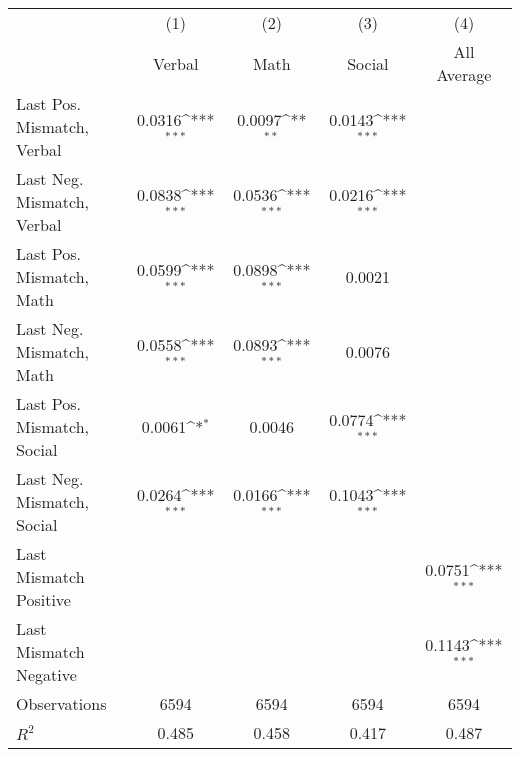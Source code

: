 {
\def\sym#1{\ifmmode^{#1}\else\(^{#1}\)\fi}
\begin{tabular}{l*{4}{c}}
\hline  
                    &\multicolumn{1}{c}{(1)}&\multicolumn{1}{c}{(2)}&\multicolumn{1}{c}{(3)}&\multicolumn{1}{c}{(4)}\\
                    &\multicolumn{1}{c}{Verbal}&\multicolumn{1}{c}{Math}&\multicolumn{1}{c}{Social}&\multicolumn{1}{c}{All Average}\\
\hline  
Last Pos. Mismatch, Verbal&      0.0316\sym{***}&      0.0097\sym{**} &      0.0143\sym{***}&                     \\
[1em]
Last Neg. Mismatch, Verbal&      0.0838\sym{***}&      0.0536\sym{***}&      0.0216\sym{***}&                     \\
[1em]
Last Pos. Mismatch, Math&      0.0599\sym{***}&      0.0898\sym{***}&      0.0021         &                     \\
[1em]
Last Neg. Mismatch, Math&      0.0558\sym{***}&      0.0893\sym{***}&      0.0076         &                     \\
[1em]
Last Pos. Mismatch, Social&      0.0061\sym{*}  &      0.0046         &      0.0774\sym{***}&                     \\
[1em]
Last Neg. Mismatch, Social&      0.0264\sym{***}&      0.0166\sym{***}&      0.1043\sym{***}&                     \\
[1em]
Last Mismatch Positive&                     &                     &                     &      0.0751\sym{***}\\
[1em]
Last Mismatch Negative&                     &                     &                     &      0.1143\sym{***}\\
\hline  
Observations        &        6594         &        6594         &        6594         &        6594         \\
\(R^{2}\)           &       0.485         &       0.458         &       0.417         &       0.487         \\
\hline  
\end{tabular}
}
